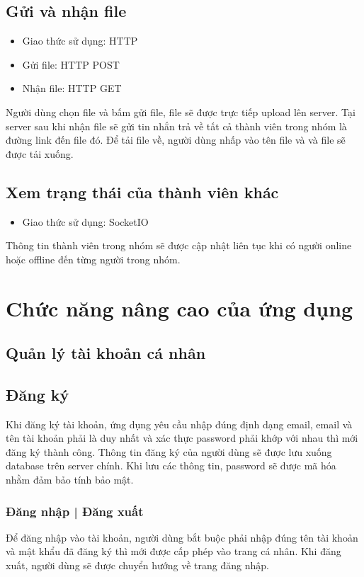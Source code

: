 \documentclass[a4paper]{article}
\begin{document}
	\subsection{Gửi và nhận file}
		\begin{itemize}
			\item Giao thức sử dụng: HTTP
			\item Gửi file: HTTP POST
			\item Nhận file: HTTP GET
		\end{itemize}
		
	Người dùng chọn file và bấm gửi file, file sẽ được trực tiếp upload lên server. Tại server sau khi nhận file sẽ gửi tin nhắn trả về tất cả thành viên trong nhóm là đường link đến file đó.\linebreak
	Để tải file về, người dùng nhấp vào tên file và và file sẽ được tải xuống.
	
	\subsection{Xem trạng thái của thành viên khác}
		\begin{itemize}
			\item Giao thức sử dụng: SocketIO
		\end{itemize}
		
	Thông tin thành viên trong nhóm sẽ được cập nhật liên tục khi có người online hoặc offline đến từng người trong nhóm.
	
\section{Chức năng nâng cao của ứng dụng}
	\subsection{Quản lý tài khoản cá nhân}
		\subsection{Đăng ký}
		Khi đăng ký tài khoản, ứng dụng yêu cầu nhập đúng định dạng email, email và tên tài khoản phải là duy nhất và xác thực password phải khớp với nhau thì mới đăng ký thành công.\linebreak
		Thông tin đăng ký của người dùng sẽ được lưu xuống database trên server chính.\linebreak
		Khi lưu các thông tin, password sẽ được mã hóa nhằm đảm bảo tính bảo mật.
		
		\subsubsection{Đăng nhập | Đăng xuất}
		Để đăng nhập vào tài khoản, người dùng bắt buộc phải nhập đúng tên tài khoản và mật khẩu đã đăng ký thì mới được cấp phép vào trang cá nhân.\linebreak
		Khi đăng xuất, người dùng sẽ được chuyển hướng về trang đăng nhập.
		
\end{document}
